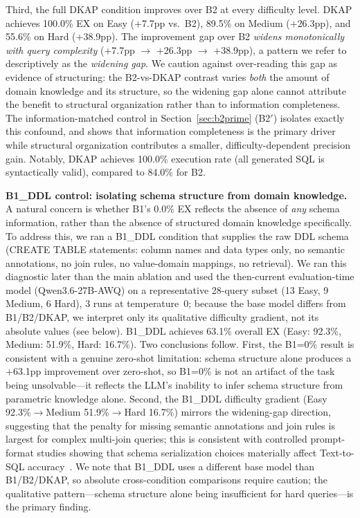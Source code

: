 \documentclass[fleqn,10pt,lineno]{wlpeerj}
\begin{document}
Third, the full DKAP condition improves over B2 at every difficulty level. DKAP achieves 100.0\% EX on Easy ($+$7.7pp vs.\ B2), 89.5\% on Medium ($+$26.3pp), and 55.6\% on Hard ($+$38.9pp). The improvement gap over B2 \textit{widens monotonically with query complexity} ($+$7.7pp $\rightarrow$ $+$26.3pp $\rightarrow$ $+$38.9pp), a pattern we refer to descriptively as the \textit{widening gap}. We caution against over-reading this gap as evidence of structuring: the B2-vs-DKAP contrast varies \textit{both} the amount of domain knowledge and its structure, so the widening gap alone cannot attribute the benefit to structural organization rather than to information completeness. The information-matched control in Section~\ref{sec:b2prime} (B2$'$) isolates exactly this confound, and shows that information completeness is the primary driver while structural organization contributes a smaller, difficulty-dependent precision gain. Notably, DKAP achieves 100.0\% execution rate (all generated SQL is syntactically valid), compared to 84.0\% for B2.

\textbf{B1\_DDL control: isolating schema structure from domain knowledge.} A natural concern is whether B1's 0.0\% EX reflects the absence of \textit{any} schema information, rather than the absence of structured domain knowledge specifically. To address this, we ran a B1\_DDL condition that supplies the raw DDL schema (CREATE TABLE statements: column names and data types only, no semantic annotations, no join rules, no value-domain mappings, no retrieval). We ran this diagnostic later than the main ablation and used the then-current evaluation-time model (Qwen3.6-27B-AWQ) on a representative 28-query subset (13 Easy, 9 Medium, 6 Hard), 3 runs at temperature~0; because the base model differs from B1/B2/DKAP, we interpret only its qualitative difficulty gradient, not its absolute values (see below). B1\_DDL achieves 63.1\% overall EX (Easy: 92.3\%, Medium: 51.9\%, Hard: 16.7\%). Two conclusions follow. First, the B1=0\% result is consistent with a genuine zero-shot limitation: schema structure alone produces a $+$63.1pp improvement over zero-shot, so B1=0\% is not an artifact of the task being unsolvable---it reflects the LLM's inability to infer schema structure from parametric knowledge alone. Second, the B1\_DDL difficulty gradient (Easy 92.3\%$\to$Medium 51.9\%$\to$Hard 16.7\%) mirrors the widening-gap direction, suggesting that the penalty for missing semantic annotations and join rules is largest for complex multi-join queries; this is consistent with controlled prompt-format studies showing that schema serialization choices materially affect Text-to-SQL accuracy~\citep{chang2023prompt}. We note that B1\_DDL uses a different base model than B1/B2/DKAP, so absolute cross-condition comparisons require caution; the qualitative pattern---schema structure alone being insufficient for hard queries---is the primary finding.
\end{document}
